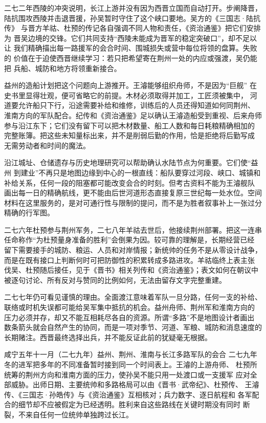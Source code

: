 二七二年西陵的冲突说明，长江上游并没有因为西晋立国而自动打开。步阐降晋，
陆抗围攻西陵并击退晋援，孙吴暂时守住了这个峡口要地。吴方的《三国志·陆抗传》
与晋方羊祜、杜预的传记各自强调不同人物和责任，《资治通鉴》把它们安排为
晋吴边境的交锋。它们共同支持“西陵未能成为晋军的稳定突破口”，却不足以让
我们精确描出每一路援军的会合时间、围城损失或营中每位将领的盘算。失败的
价值在于迫使西晋继续学习：若只把希望寄在荆州一处的内应或强渡，吴仍能把
兵船、城防和地方将领重新接合。

益州的造船计划把这个问题向上游推开。王濬能够组织舟师，不是因为“巨舰”
在史书里显得壮观，便可省略它的前提。木材必须取得并加工，工匠须被集中，
河道要允许船只下行，沿途需要补给和维修，训练后的人员还得知道如何同荆州、
淮南方向的军队配合。纪传和《资治通鉴》足以确认王濬造船受到重视、后来舟师
参与沿江东下；它们没有留下可以把木材数量、船工人数和每日耗粮精确相加的
完整账簿。把这些未知量标出来，并不是削弱后勤的作用，恰是拒绝将后勤写成
无需劳动者和时间的魔法。

沿江城址、仓储遗存与历史地理研究可以帮助确认水陆节点为何重要。它们使“益州
到建业”不再只是地图边缘到中心的一根直线：船队要穿过河段、峡口、城镇和
补给关系，任何一段的阻塞都可能改变会合的时刻。但考古资料不能为王濬舰队
画出每一日的精确航线，更不能由后世河道形态直接复原三世纪每一处水位。空间
材料在这里服务的，是对可通行性与限制的提问，而不是为胜者叙事补上一张过分
精确的行军图。

二七六年杜预参与荆州军务，二七八年羊祜去世后，他接续荆州部署。把这一连串
任命称作“为杜预量身准备的胜利”会倒果为因。较可靠的理解是，长期经营已经
留下需要接手的城防、粮运、人员和对岸情报；新统帅的任务不是从零设计战争，
而是在既有接口上判断何时可把防御性的积累转成多路进攻。羊祜临终上表主张
伐吴、杜预随后接任，见于《晋书》相关列传和《资治通鉴》；表文如何在朝议中
被逐句讨论、所有反对与赞同的比例如何，无法由留存文字完整重建。

二七七年仍可看见谨慎的理由。全面渡江意味着军队一旦分路，任何一支的补给、
联络或时机失误都可能给吴军集中抵抗的机会。益州舟师、荆州军和淮南方向的
压力必须并存，却又不能互相耗尽各自的资源。所谓“多路”不是地图设计者画出
数条箭头就会自然产生的协同，而是一项对季节、河道、军粮、城防和消息速度的
长期赌注。西晋最终选择出兵，并不能反证此前的犹疑毫无根据。

\begin{event}{}{咸宁五年十一月（二七九年）}{益州、荆州、淮南与长江}{多路军队的会合}
二七九年冬的进军把多年的不同准备暂时接到同一个时间表上。王濬的上游舟师、
杜预所统筹的荆州方向和淮南方面的压力，使孙吴不能只用一处渡口或一支援军
应对全部威胁。出师日期、主要统帅和多路格局可以由《晋书·武帝纪》、杜预传、
王濬传、《三国志·孙皓传》与《资治通鉴》互相核对；兵力数字、逐日航程和
各军配合的细节却不应被假定为已经透明。胜利来自这些路线在关键时期没有同时
断裂，不来自任何一位统帅单独跨过长江。
\end{event}

